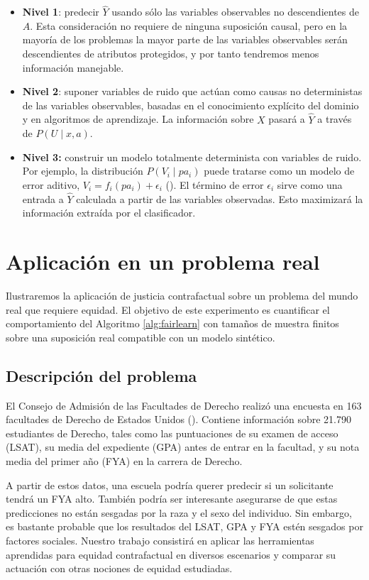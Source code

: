 \documentclass[oneside,openright,titlepage,numbers=noenddot,openany,headinclude,footinclude=true,
cleardoublepage=empty,abstractoff,BCOR=5mm,paper=a4,fontsize=12pt,main=spanish]{scrreprt}
\begin{document}
\begin{itemize}
    \item \textbf{Nivel 1}: predecir $\hat{Y}$ usando sólo las variables observables no descendientes de $A$. Esta consideración no requiere de ninguna suposición causal, pero en la mayoría de los problemas la mayor parte de las variables observables serán descendientes de atributos protegidos, y por tanto tendremos menos información manejable.
    \item \textbf{Nivel 2}: suponer variables de ruido que actúan como causas no deterministas de las variables observables, basadas en el conocimiento explícito del dominio y en algoritmos de aprendizaje. La información sobre $X$ pasará a $\hat{Y}$ a través de $P(U \mid x, a)$.
    \item \textbf{Nivel 3:} construir un modelo totalmente determinista con variables de ruido. Por ejemplo, la distribución $P(V_i \mid pa_i)$ puede tratarse como un modelo de error aditivo, $V_i =f_i(pa_i)+\epsilon_i$ (\cite{noise2014}). El término de error $\epsilon_i$ sirve como una entrada a $\hat{Y}$ calculada a partir de las variables observadas. Esto maximizará la información extraída por el clasificador.
\end{itemize}

\section{Aplicación en un problema real}

Ilustraremos la aplicación de justicia contrafactual sobre un problema del mundo real que requiere equidad. El objetivo de este experimento es cuantificar el comportamiento del Algoritmo \ref{alg:fairlearn} con tamaños de muestra finitos sobre una suposición real compatible con un modelo sintético.

\subsection{Descripción del problema} \label{subsec:desproblem}

El Consejo de Admisión de las Facultades de Derecho realizó una encuesta en 163 facultades de Derecho de Estados Unidos (\cite{lsac1998}). Contiene información sobre 21.790 estudiantes de Derecho, tales como las puntuaciones de su examen de acceso (LSAT), su media del expediente (GPA) antes de entrar en la facultad, y su nota media del primer año (FYA) en la carrera de Derecho.

A partir de estos datos, una escuela podría querer predecir si un solicitante tendrá un FYA alto. También podría ser interesante asegurarse de que estas predicciones no están sesgadas por la raza y el sexo del individuo. Sin embargo, es bastante probable que los resultados del LSAT, GPA y FYA estén sesgados por factores sociales. Nuestro trabajo consistirá en aplicar las herramientas aprendidas para equidad contrafactual en diversos escenarios y comparar su actuación con otras nociones de equidad estudiadas.
\end{document}
